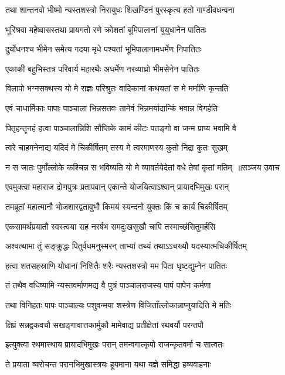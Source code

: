 \twolineshloka
{तथा शान्तनवो भीष्मो न्यस्तशस्त्रो निरायुधः}
{शिखण्डिनं पुरस्कृत्य हतो गाण्डीवधन्वना}


\twolineshloka
{भूरिश्रवा महेष्वासस्तथा प्रायगतो रणे}
{क्रोशतां बूमिपालानां युयुधानेन पातितः}


\twolineshloka
{दुर्योधनश्च भीमेन समेत्य गदया मृधे}
{पश्यतां भूमिपालानामधर्मेण निपातितः}


\twolineshloka
{एकाकी बहुभिस्तत्र परिवार्य महारथैः}
{अधर्मेण नरव्याघ्रो भीमसेनेन पातितः}


\twolineshloka
{विलापो भग्नसक्थस्य यो मे राज्ञः परिश्रुतः}
{वादिकानां कथयतां स मे मर्माणि कृन्तति}


\twolineshloka
{एवं चाधार्मिकाः पापाः पाञ्चाला भिन्नसतवः}
{तानेवं भिन्नमर्यादान्किं भवान्न विगर्हति}


\twolineshloka
{पितृहन्तॄनहं हत्वा पाञ्चालान्निशि सौप्तिके}
{कामं कीटः पतङ्गो वा जन्म प्राप्य भवामि वै}


\twolineshloka
{त्वरे चाहमनेनाद्य यदिदं मे चिकीर्षितम्}
{तस्य मे त्वरमाणस्य कुतो निद्रा कुतः सुखम्}


\threelineshloka
{न स जातः पुमाँल्लोके कश्चिन्न स भविष्यति}
{यो मे व्यावर्तयेदेतां वधे तेषां कृतां मतिम् ॥सञ्जय उवाच}
{}


\twolineshloka
{एवमुक्त्वा महाराज द्रोणपुत्रः प्रतापवान्}
{एकान्ते योजयित्वाऽश्वान् प्रायादभिमुखः परान्}


\twolineshloka
{तमब्रूतां महात्मानौ भोजशारद्वतावुभौ}
{किमयं स्यन्दनो युक्तः किं च कार्यं चिकीर्षितम्}


\twolineshloka
{एकसामर्थप्रयातौ स्वस्त्वया सह नरर्षभ}
{समदुःखसुखौ चापि तस्माच्छंसितुमर्हसि}


\twolineshloka
{अश्वत्थामा तुं सङ्क्रुद्धः पितुर्वधमनुस्मरन्}
{ताभ्यां तथ्यं तथाऽऽचख्यौ यदस्यात्मचिकीर्षितम्}


\twolineshloka
{हत्वा शतसहस्राणि योधानां निशितैः शरैः}
{न्यस्तशस्त्रो मम पिता धृष्टद्युम्नेन पातितः}


\twolineshloka
{तं तथैव वधिष्यामि न्यस्तवर्माणमद्य वै}
{पुत्रं पाञ्चालराजस्य पापं पापेन कर्मणा}


\twolineshloka
{तथा विनिहतः पापः पाञ्चाल्यः पशुवन्मया}
{शस्त्रेण विजिताँल्लोकान्नाप्नुयादिति मे मतिः}


\twolineshloka
{क्षिप्रं सन्नद्वकवचौ सखङ्गावात्तकार्मुकौ}
{मामेवाद्य प्रतीक्षेतां रथवर्यौ परन्तपौ}


\twolineshloka
{इत्युक्त्वा रथमास्थाय प्रायादभिमुखः परान्}
{तमन्वगात्कृपो राजन्कृतवर्मा च सात्वतः}


\twolineshloka
{ते प्रयाता व्यरोचन्त परानभिमुखास्त्रयः}
{हूयमाना यथा यज्ञे समिद्धा हव्यवाहनाः}


